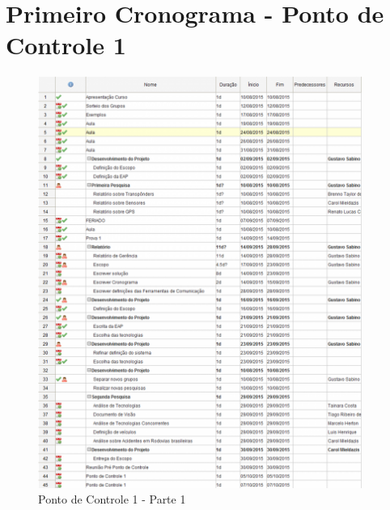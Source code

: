 \chapter[Cronograma]{Primeiro Cronograma - Ponto de Controle 1}

\begin{figure}[h]
  \centering
  \includegraphics[width=400px, scale=1]{figuras/1cronograma}
  \caption{Ponto de Controle 1 - Parte 1}
\label{fig:1cronograma}
\end{figure}
